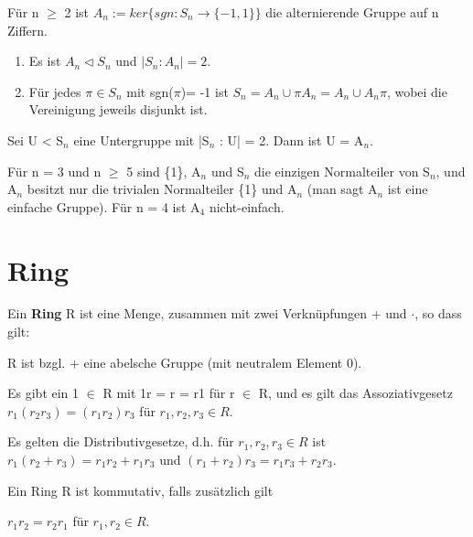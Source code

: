 \begin{definition}
Für n $\ge$ 2 ist $A_n := ker\{sgn : S_n \to \{-1,1\}\}$ die alternierende Gruppe auf n Ziffern.
\begin{enumerate}
\item Es ist $A_n \vartriangleleft S_n$ und $|S_n : A_n| = 2$.
\item Für jedes $\pi \in S_n$ mit sgn($\pi$)= -1 ist $S_n = A_n \cup \pi A_n = A_n \cup A_n \pi$, wobei die Vereinigung jeweils disjunkt ist.
\end{enumerate}
\end{definition}

\begin{example}
Sei U < S$_n$ eine Untergruppe mit |S$_n$ : U| = 2. Dann ist U = A$_n$.
\end{example}

\begin{remark}
Für n = 3 und n $\ge$ 5 sind \{1\}, A$_n$ und S$_n$ die einzigen Normalteiler von S$_n$, und A$_n$ besitzt nur die trivialen Normalteiler \{1\} und A$_n$ (man sagt A$_n$ ist eine einfache Gruppe). Für n = 4 ist A$_4$ nicht-einfach.
\end{remark}

\section{Ring}
\begin{definition}
Ein \textbf{Ring} R ist eine Menge, zusammen mit zwei Verknüpfungen + und $\cdot$, so dass gilt:
\begin{compactenum}
\item R ist bzgl. + eine abelsche Gruppe (mit neutralem Element 0).
\item Es gibt ein 1 $\in$ R mit 1r = r = r1 für r $\in$ R, und es gilt das Assoziativgesetz $r_1(r_2r_3) = (r_1r_2)r_3$ für $r_1, r_2, r_3 \in R$.
\item Es gelten die Distributivgesetze, d.h. für $r_1, r_2, r_3 \in R$ ist $r_1(r_2 + r_3) = r_1r_2 + r_1r_3$ und $(r_1 + r_2)r_3 = r_1r_3 + r_2r_3$.
\end{compactenum}
Ein Ring R ist kommutativ, falls zusätzlich gilt
\begin{compactenum}
\setcounter{enumi}{3}
\item $r_1r_2 = r_2r_1$ für $r_1,r_2 \in R$.
\end{compactenum}
\end{definition}

